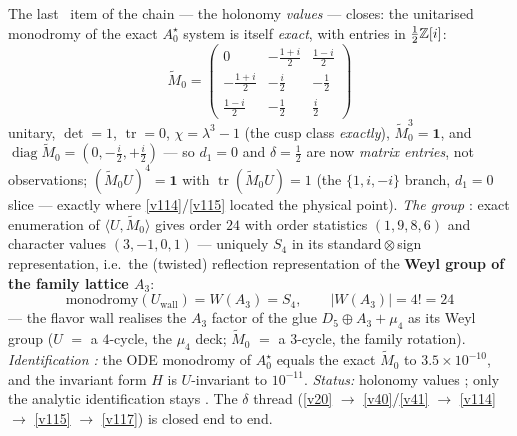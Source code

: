 \begin{keybox}
The last \mE\ item of the chain --- the holonomy \emph{values} --- closes: the unitarised monodromy of
the exact $A_0^\star$ system is itself \emph{exact}, with entries in $\tfrac12\mathbb Z[i]$:
\[
  \boxed{\ \widetilde M_0=\begin{pmatrix}0&-\tfrac{1+i}2&\tfrac{1-i}2\\[2pt]
  -\tfrac{1+i}2&-\tfrac i2&-\tfrac12\\[2pt]
  \tfrac{1-i}2&-\tfrac12&\tfrac i2\end{pmatrix}\ }
\]
unitary, $\det=1$, $\operatorname{tr}=0$, $\chi=\lambda^3-1$ (the cusp class \emph{exactly}),
$\widetilde M_0^3=\mathbf1$, and $\operatorname{diag}\widetilde M_0=(0,-\tfrac i2,+\tfrac i2)$ --- so
$d_1=0$ and $\delta=\tfrac12$ are now \emph{matrix entries}, not observations; $(\widetilde M_0U)^4=\mathbf1$
with $\operatorname{tr}(\widetilde M_0U)=1$ (the $\{1,i,-i\}$ branch, $d_1=0$ slice --- exactly where
\vref{v114}/\vref{v115} located the physical point). \emph{The group} \mE: exact enumeration of
$\langle U,\widetilde M_0\rangle$ gives order $24$ with order statistics $(1,9,8,6)$ and character
values $(3,-1,0,1)$ --- uniquely $S_4$ in its standard${}\otimes{}$sign representation, i.e.\ the
(twisted) reflection representation of the \textbf{Weyl group of the family lattice $A_3$}:
\[
  \boxed{\ \text{monodromy}(U_{\mathrm{wall}})=W(A_3)=S_4,\qquad |W(A_3)|=4!=24\ }
\]
--- the flavor wall realises the $A_3$ factor of the glue $D_5\oplus A_3+\mu_4$ as its Weyl group ($U$
$=$ a $4$-cycle, the $\mu_4$ deck; $\widetilde M_0$ $=$ a $3$-cycle, the family rotation).
\emph{Identification \mE:} the ODE monodromy of $A_0^\star$ equals the exact $\widetilde M_0$ to
$3.5\times10^{-10}$, and the invariant form $H$ is $U$-invariant to $10^{-11}$. \emph{Status:} holonomy
values \mE; only the analytic identification stays \mE. The $\delta$ thread
(\vref{v20} $\to$ \vref{v40}/\vref{v41} $\to$ \vref{v114} $\to$ \vref{v115} $\to$ \vref{v117}) is closed end to end.
\end{keybox}

